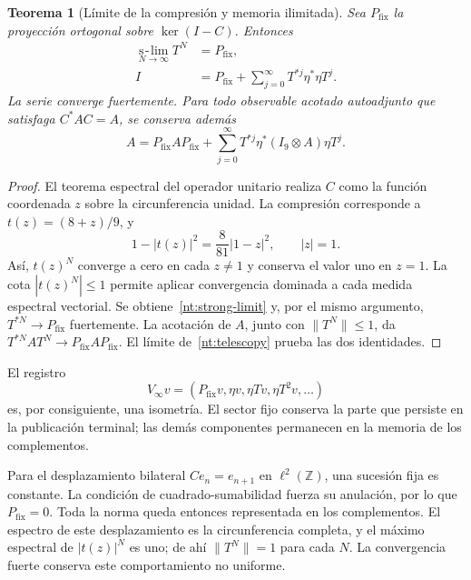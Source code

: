 \documentclass[a4paper,10pt]{article}
\newtheorem{theorem}{Teorema}[section]
\theoremstyle{definition}\newtheorem{definition}[theorem]{Definición}
\theoremstyle{remark}\newtheorem{remark}[theorem]{Observación}
\numberwithin{equation}{section}
\begin{document}
\begin{theorem}[Límite de la compresión y memoria ilimitada]
Sea \(P_{\mathrm{fix}}\) la proyección ortogonal sobre
\(\ker(I-C)\). Entonces
\begin{align}
 \operatorname*{s\!-\!lim}_{N\to\infty}T^N
   &=P_{\mathrm{fix}},\label{nt:strong-limit}\\
 I&=P_{\mathrm{fix}}+
 \sum_{j=0}^{\infty}T^{*j}\eta^*\eta T^j.\label{nt:infinite-record}
\end{align}
La serie converge fuertemente. Para todo observable acotado
autoadjunto que satisfaga \(C^*AC=A\), se conserva además
\begin{equation}
 A=P_{\mathrm{fix}}AP_{\mathrm{fix}}+
 \sum_{j=0}^{\infty}
 T^{*j}\eta^*(I_9\otimes A)\eta T^j.
 \label{nt:infinite-observable}
\end{equation}
\end{theorem}

\begin{proof}
El teorema espectral del operador unitario realiza \(C\) como
la función coordenada \(z\) sobre la circunferencia unidad.
La compresión corresponde a \(t(z)=(8+z)/9\), y
\begin{equation}
 1-|t(z)|^2=\frac8{81}|1-z|^2,
 \qquad |z|=1.
 \label{nt:circular-defect}
\end{equation}
Así, \(t(z)^N\) converge a cero en cada \(z\ne1\) y conserva
el valor uno en \(z=1\). La cota \(|t(z)^N|\leq1\) permite
aplicar convergencia dominada a cada medida espectral vectorial.
Se obtiene~\eqref{nt:strong-limit} y, por el mismo argumento,
\(T^{*N}\to P_{\mathrm{fix}}\) fuertemente. La acotación de
\(A\), junto con \(\|T^N\|\leq1\), da
\(T^{*N}AT^N\to P_{\mathrm{fix}}AP_{\mathrm{fix}}\).
El límite de~\eqref{nt:telescopy} prueba las dos identidades.
\end{proof}

El registro
\[
 V_\infty v=(P_{\mathrm{fix}}v,\eta v,\eta Tv,\eta T^2v,\ldots)
\]
es, por consiguiente, una isometría. El sector fijo conserva la
parte que persiste en la publicación terminal; las demás
componentes permanecen en la memoria de los complementos.

Para el desplazamiento bilateral
\(C e_n=e_{n+1}\) en \(\ell^2(\mathbb Z)\), una sucesión fija
es constante. La condición de cuadrado-sumabilidad fuerza su
anulación, por lo que \(P_{\mathrm{fix}}=0\). Toda la norma
queda entonces representada en los complementos. El espectro de
este desplazamiento es la circunferencia completa, y el máximo
espectral de \(|t(z)|^N\) es uno; de ahí
\(\|T^N\|=1\) para cada \(N\). La convergencia fuerte conserva
este comportamiento no uniforme.
\end{document}
